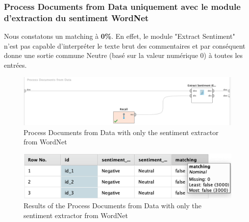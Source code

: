 \documentclass[a4paper]{article}
\begin{document}
\subsubsection{Process Documents from Data uniquement avec le module d'extraction du sentiment WordNet}
Nous constatons un matching à \textbf{0\%}. En effet, le module "Extract Sentiment" n'est pas capable d'interpréter le texte brut des commentaires et par conséquent donne une sortie commune Neutre (basé sur la valeur numérique 0) à toutes les entrées.
\begin{figure}[H]
	\includegraphics[width=\linewidth]{imgs/part_3/3_processing_documents_no_stem_filter_token_stopword_transform_tokens}
	\caption{Process Documents from Data with only the sentiment extractor from WordNet}
	\label{fig:3_processing_documents_no_stem_filter_token_stopword_transform_tokens}
\end{figure}
\begin{figure}[H]
	\includegraphics[width=\linewidth]{imgs/part_3/3_processing_documents_no_stem_filter_token_stopword_transform_tokens_results}
	\caption{Results of the Process Documents from Data with only the sentiment extractor from WordNet}
	\label{fig:3_processing_documents_no_stem_filter_token_stopword_transform_tokens_results}
\end{figure}

\vspace{6pt}
\end{document}
